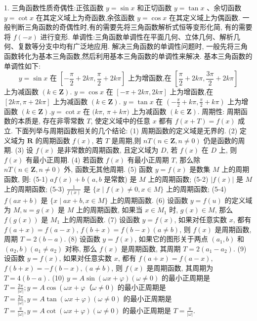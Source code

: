 
1. 三角函数性质奇偶性:正弦函数 $y=\sin x$ 和正切函数 $y=\tan x$ 、余切函数 $y=\cot x$ 在其定义域上为奇函数,余弦函数 $y=\cos x$ 在其定义域上为偶函数.
一般判断三角函数的奇偶性时,有的需要先将三角函数解析式恒等变形化简, 有的需要将 $f(-x)$ 进行变形.
单调性:三角函数单调性在平面几何、立体几何、解析几何、复数等分支中均有广泛地应用.
解决三角函数的单调性问题时, 一般先将三角函数转化为基本三角函数,然后利用基本三角函数的单调性来解决.
基本三角函数的单调性如下:
$$
y=\sin x \text { 在 }\left[-\frac{\pi}{2}+2 k \pi, \frac{\pi}{2}+2 k \pi\right] \text { 上为增函数,在 }\left[\frac{\pi}{2}+2 k \pi, \frac{3 \pi}{2}+2 k \pi\right]
$$
上为减函数 $(k \in \mathbf{Z})$.
$y=\cos x$ 在 $[-\pi+2 k \pi, 2 k \pi]$ 上为增函数,在 $[2 k \pi, \pi+2 k \pi]$ 上为减函数 $(k \in \mathbf{Z})$.
$y=\tan x$ 在 $\left(-\frac{\pi}{2}+k \pi, \frac{\pi}{2}+k \pi\right)$ 上为增函数 $(k \in \mathbf{Z}) . y=\cot x$ 在 $(k \pi$, $\pi+k \pi)$ 上为减函数 $(k \in \mathbf{Z})$.
周期性: 周期函数的本质是, 存在非零常数 $T$, 使定义域中的任意 $x$ 都有 $f(x+T)=f(x)$ 成立.
下面列举与周期函数相关的几个结论:
(1) 周期函数的定义域是无界的.
(2) 定义域为 $\mathbf{R}$ 的周期函数 $f(x)$, 若 $T$ 是周期,则 $n T(n \in \mathbf{Z}, n \neq 0)$ 仍是函数的周期.
(3) 设 $f(x)$ 是非常数的周期函数, 且定义域为 $D$, 若 $f(x)$ 在 $D$ 上, 则 $f(x)$ 有最小正周期.
(4) 若函数 $f(x)$ 有最小正周期 $T$, 那么除 $n T(n \in \mathbf{Z}, n \neq 0)$ 外, 函数无其他周期.
(5) 函数 $y=f(x)$ 是数集 $M$ 上的周期函数, 则:
(5-1) $a f(x)+b$ ( $a, b$ 是常数) 是 $M$ 上的周期函数;
(5-2) $|f(x)|$ 是 $M$ 上的周期函数;
(5-3) $\frac{1}{f(x)}$ 是 $\{x \mid f(x) \neq 0, x \in M\}$ 上的周期函数;
(5-4) $f(a x+b)$ 是 $\{x \mid a x+b, x \in M\}$ 上的周期函数.
(6) 设函数 $y=f(u)$ 的定义域为 $M, u=g(x)$ 是 $M$ 上的周期函数, 如果当 $x \in M_1$ 时, $g(x) \in M$, 那么 $f(g(x))$ 是 $M_1$ 上的周期函数.
(7) 设函数 $y=f(x)$, 如果对任意实数 $x$, 都有 $f(a+x)=f(a-x)$, $f(b+x)=f(b-x)(a \neq b)$, 则 $f(x)$ 是周期函数, 周期 $T=2(b-a)$.
(8) 设函数 $y=f(x)$, 如果它的图形关于两点 $\left(a_1, b\right)$ 和 $\left(a_2, b\right)\left(a_1 \neq a_2\right)$ 对称, 那么 $f(x)$ 是周期函数, 其周期 $T=2\left(a_1-a_2\right)$.
(9) 设函数 $y=f(x)$, 如果对任意实数 $x$, 都有 $f(a+x)=f(a-x)$, $f(b+x)=-f(b-x),(a \neq b)$, 则 $f(x)$ 是周期函数, 其周期为 $T=4(b-a)$.
(10) $y=A \sin (\omega x+\varphi)(\omega \neq 0)$ 的最小正周期是 $T=\frac{2 \pi}{|\omega|} ; y=A \cos (\omega x+ \varphi （ \omega \neq 0)$ 的最小正周期是 $T=\frac{2 \pi}{|\omega|}, y=A \tan (\omega x+\varphi)(\omega \neq 0)$ 的最小正周期是 $T=\frac{\pi}{|\omega|}, y=A \cot (\omega x+\varphi)(\omega \neq 0)$ 的最小正周期是 $T=\frac{\pi}{|\omega|}$.
